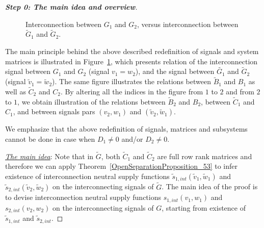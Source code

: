 \documentclass[11pt,a4paper,oneside,DIV=12,headings=small]{scrartcl}
\theoremstyle{plain}
\begin{document}
\begin{proof}[\textbf{Step 0: \textit{The main idea and overview}}]
\begin{figure}[h!]
\caption{Interconnection between $G_1$ and $G_2$, versus interconnection between $\tilde{G}_1$ and $\tilde{G}_2$.}
\label{Substitution}
\end{figure}

The main principle behind the above described redefinition of signals and system matrices is illustrated in Figure~\ref{Substitution}, which presents relation of the interconnection signal between $G_1$ and $G_2$ (signal $v_1=w_2$), and the signal between $\tilde{G_1}$ and $\tilde{G}_2$ (signal $\tilde{v}_1=\tilde{w}_2$). The same figure illustrates the relations between $\tilde{B}_1$ and $B_1$ as well as $\tilde{C}_2$ and $C_2$. By altering all the indices in the figure from $1$ to $2$ and from $2$ to $1$, we obtain illustration of the relations between $\tilde{B}_2$ and $B_2$, between $\tilde{C}_1$ and $C_1$, and between signals pars $(v_2,w_1)$ and $(\tilde{v}_2,\tilde{w}_1)$.

We emphasize that the above redefinition of signals, matrices and subsystems cannot be done in case when $D_1 \neq 0$ and/or $D_2 \neq 0$.  

\underline{\emph{The main idea}}: Note that in $\tilde{G}$, both $\tilde{C}_1$ and $\tilde{C}_2$ are full row rank matrices and therefore we can apply Theorem~\ref{OpenSeparationProposition_53} to infer existence of interconnection neutral supply functions $\tilde{s}_{1,int}(\tilde{v}_1,\tilde{w}_1)$ and $\tilde{s}_{2,int}(\tilde{v}_2,\tilde{w}_2)$ on the interconnecting signals of $\tilde{G}$. 
The main idea of the proof is to devise interconnection neutral supply functions $s_{1,int}(v_1,w_1)$ and $s_{2,int}(v_2,w_2)$ on the interconnecting signals of $G$, starting from existence of $\tilde{s}_{1,int}$ and $\tilde{s}_{2,int}$.


\end{proof}
\end{document}
